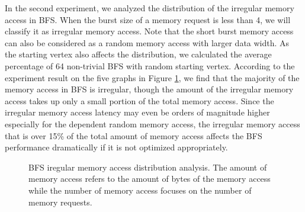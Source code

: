 In the second experiment, we analyzed the distribution of the irregular memory access in BFS. 
When the burst size of a memory request is less than 4, we will classify 
it as irregular memory access. Note that the short burst memory access can also be considered as 
a random memory access with larger data width. As the starting vertex also affects the distribution, 
we calculated  the average percentage of 64 non-trivial BFS with random starting vertex. 
According to the experiment result on the five graphs 
in Figure \ref{fig:bfs-mem-dist}, we find that the majority of the memory access in BFS is irregular, 
though the amount of the irregular memory access takes up only a small portion of the total memory access. 
Since the irregular memory access latency may even be orders of magnitude higher 
especially for the dependent random memory access, the irregular memory access that is over 15\% of 
the total amount of memory access affects the BFS performance dramatically if it is not 
optimized appropriately. 
\begin{figure}
    \caption{BFS iregular memory access distribution analysis. The amount of memory access refers to the amount of 
	bytes of the memory access while the number of memory access focuses on the number of memory requests.}
\label{fig:bfs-mem-dist}
\vspace{-0.5em}
\end{figure}


